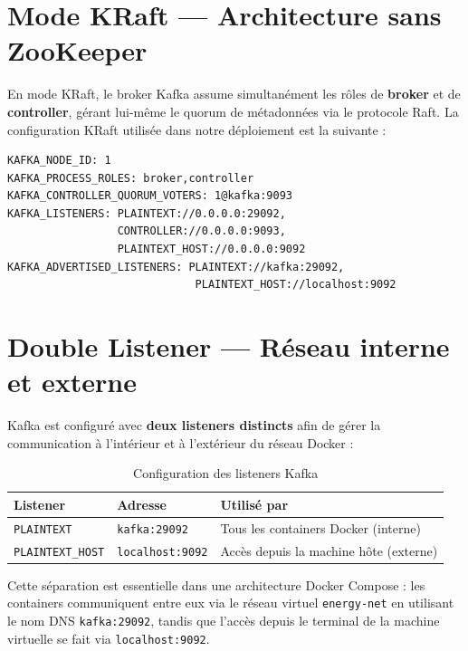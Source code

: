 \documentclass[1pt,a4paper]{report}
\begin{document}
\section{Mode KRaft — Architecture sans ZooKeeper}

En mode KRaft, le broker Kafka assume simultanément les rôles de \textbf{broker} et de
\textbf{controller}, gérant lui-même le quorum de métadonnées via le protocole Raft.
La configuration KRaft utilisée dans notre déploiement est la suivante :

\begin{lstlisting}[language=bash, caption={Configuration Kafka KRaft dans Docker Compose}]
KAFKA_NODE_ID: 1
KAFKA_PROCESS_ROLES: broker,controller
KAFKA_CONTROLLER_QUORUM_VOTERS: 1@kafka:9093
KAFKA_LISTENERS: PLAINTEXT://0.0.0.0:29092,
                 CONTROLLER://0.0.0.0:9093,
                 PLAINTEXT_HOST://0.0.0.0:9092
KAFKA_ADVERTISED_LISTENERS: PLAINTEXT://kafka:29092,
                             PLAINTEXT_HOST://localhost:9092
\end{lstlisting}

\section{Double Listener — Réseau interne et externe}

Kafka est configuré avec \textbf{deux listeners distincts} afin de gérer la communication
à l'intérieur et à l'extérieur du réseau Docker :

\begin{table}[H]
\centering
\begin{tabular}{|l|l|l|}
\hline
\textbf{Listener} & \textbf{Adresse} & \textbf{Utilisé par} \\
\hline
\texttt{PLAINTEXT} & \texttt{kafka:29092} & Tous les containers Docker (interne) \\
\hline
\texttt{PLAINTEXT\_HOST} & \texttt{localhost:9092} & Accès depuis la machine hôte (externe) \\
\hline
\end{tabular}
\caption{Configuration des listeners Kafka}
\label{tab:kafka_listeners}
\end{table}

Cette séparation est essentielle dans une architecture Docker Compose : les containers
communiquent entre eux via le réseau virtuel \texttt{energy-net} en utilisant le nom DNS
\texttt{kafka:29092}, tandis que l'accès depuis le terminal de la machine virtuelle se fait
via \texttt{localhost:9092}.
\end{document}
